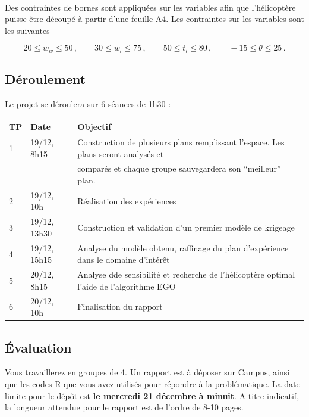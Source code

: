 \documentclass[a4paper,10pt]{article}
\begin{document}
\paragraph{}
Des contraintes de bornes sont appliquées sur les variables afin que l'hélicoptère puisse être découpé à partir d'une feuille A4. Les contraintes sur les variables sont les suivantes

\begin{equation*}
20  \leq w_w \leq 50 \, , \qquad 30 \leq w_l \leq 75 \, , \qquad 50   \leq t_l \leq 80 \, , \qquad -15  \leq \theta \leq 25 \, .
\end{equation*}

\subsection*{Déroulement}

Le projet se déroulera sur 6 séances de 1h30 :
\begin{center}
\begin{tabular}{l|l|l}
 TP & Date & Objectif \\
 \hline
 1 & 19/12, 8h15 & Construction de plusieurs plans remplissant l'espace. Les plans seront analysés et \\
 & & comparés et chaque groupe sauvegardera son ``meilleur'' plan.\\
 \hline
 2 & 19/12, 10h & Réalisation des expériences \\
 \hline
 3 & 19/12, 13h30 & Construction et validation d'un premier modèle de krigeage\\
 \hline
 4 & 19/12, 15h15 & Analyse du modèle obtenu, raffinage du plan d'expérience dans le domaine d'intérêt\\
  \hline
 5 & 20/12, 8h15 & Analyse dde sensibilité et recherche de l'hélicoptère optimal l'aide de l'algorithme EGO\\
  \hline
 6 & 20/12, 10h & Finalisation du rapport
\end{tabular}
\end{center}

\subsection*{Évaluation}
Vous travaillerez en groupes de 4. Un rapport est à déposer sur Campus, ainsi que les codes R que vous avez utilisés pour répondre à la problématique. La date limite pour le dépôt est \textbf{le mercredi 21 décembre à minuit}. A titre indicatif, la longueur attendue pour le rapport est de l'ordre de 8-10 pages.
\end{document}
